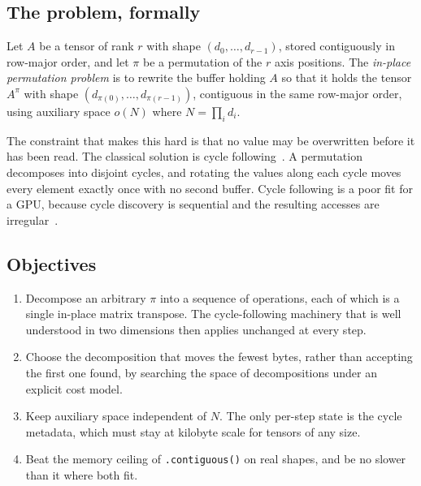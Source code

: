 \subsection{The problem, formally}

Let $A$ be a tensor of rank $r$ with shape $(d_0, \ldots, d_{r-1})$, stored
contiguously in row-major order, and let $\pi$ be a permutation of the $r$
axis positions. The \emph{in-place permutation problem} is to rewrite the
buffer holding $A$ so that it holds the tensor $A^{\pi}$ with shape
$(d_{\pi(0)}, \ldots, d_{\pi(r-1)})$, contiguous in the same row-major order,
using auxiliary space $o(N)$ where $N = \prod_i d_i$.

The constraint that makes this hard is that no value may be overwritten before
it has been read. The classical solution is cycle
following~\cite{gustavson2012cycleleader,dummit2003abstract}. A permutation
decomposes into disjoint cycles, and rotating the values along each cycle
moves every element exactly once with no second buffer. Cycle following is a
poor fit for a GPU, because cycle discovery is sequential and the resulting
accesses are irregular~\cite{catanzaro2014decomposition,gomezluna2016inplace}.

\subsection{Objectives}

\begin{enumerate}
\item Decompose an arbitrary $\pi$ into a sequence of operations, each of
  which is a single in-place matrix transpose. The cycle-following machinery
  that is well understood in two dimensions then applies unchanged at every
  step.
\item Choose the decomposition that moves the fewest bytes, rather than
  accepting the first one found, by searching the space of decompositions
  under an explicit cost model.
\item Keep auxiliary space independent of $N$. The only per-step state is the
  cycle metadata, which must stay at kilobyte scale for tensors of any size.
\item Beat the memory ceiling of \texttt{.contiguous()} on real shapes, and be
  no slower than it where both fit.
\end{enumerate}
